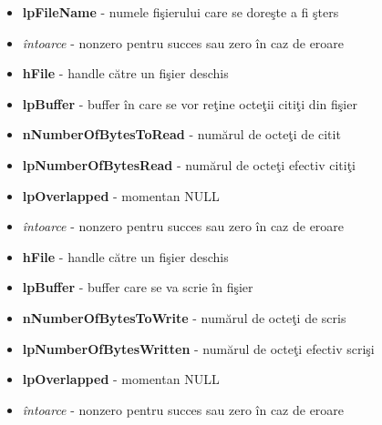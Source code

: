 \documentclass{refcard.cs.pub.ro}
\begin{document}
\begin{multicols*}{3}
\begin{itemize}
\item \textbf{lpFileName} - numele fişierului care se doreşte a fi şters
\item \textit{întoarce} - nonzero pentru succes sau zero în caz de eroare
\end{itemize} 


\begin{itemize}
\item \textbf{hFile} - handle către un fişier deschis
\item \textbf{lpBuffer} - buffer în care se vor reţine octeţii citiţi din fişier
\item \textbf{nNumberOfBytesToRead} - numărul de octeţi de citit
\item \textbf{lpNumberOfBytesRead} - numărul de octeţi efectiv citiţi
\item \textbf{lpOverlapped} - momentan NULL
\item \textit{întoarce} - nonzero pentru succes sau zero în caz de eroare
\end{itemize}

\begin{itemize}
\item \textbf{hFile} - handle către un fişier deschis
\item \textbf{lpBuffer} - buffer care se va scrie în fişier
\item \textbf{nNumberOfBytesToWrite} - numărul de octeţi de scris
\item \textbf{lpNumberOfBytesWritten} - numărul de octeţi efectiv scrişi
\item \textbf{lpOverlapped} - momentan NULL
\item \textit{întoarce} - nonzero pentru succes sau zero în caz de eroare
\end{itemize}


\end{multicols*}
\end{document}

